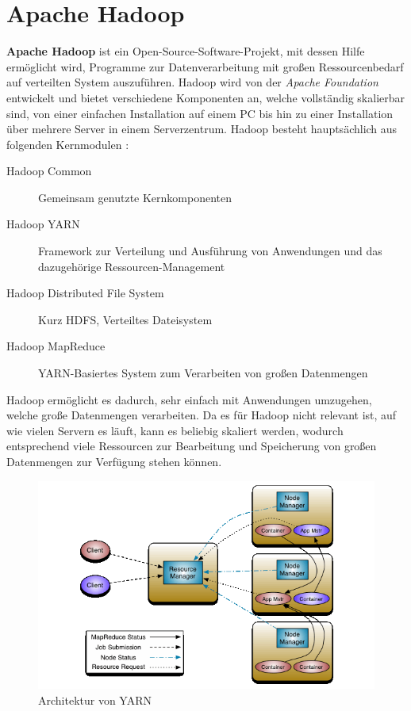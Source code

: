 \section{Apache Hadoop}\label{sec:hadoop}

\textbf{Apache Hadoop} ist ein Open-Source-Software-Projekt, mit dessen Hilfe ermöglicht wird, Programme zur Datenverarbeitung mit großen Ressourcenbedarf auf verteilten System auszuführen. Hadoop wird von der \emph{Apache Foundation} entwickelt und bietet verschiedene Komponenten an, welche vollständig skalierbar sind, von einer einfachen Installation auf einem PC bis hin zu einer Installation über mehrere Server in einem Serverzentrum. Hadoop besteht hauptsächlich aus folgenden Kernmodulen \cite{HadoopHomePage}:

\begin{description}
	\item[Hadoop Common] Gemeinsam genutzte Kernkomponenten
	\item[Hadoop YARN] Framework zur Verteilung und Ausführung von Anwendungen und das dazugehörige Ressourcen-Management
	\item[Hadoop Distributed File System] Kurz HDFS, Verteiltes Dateisystem
	\item[Hadoop MapReduce] YARN-Basiertes System zum Verarbeiten von großen Datenmengen
\end{description}

Hadoop ermöglicht es dadurch, sehr einfach mit Anwendungen umzugehen, welche große Datenmengen verarbeiten. Da es für Hadoop nicht relevant ist, auf wie vielen Servern es läuft, kann es beliebig skaliert werden, wodurch entsprechend viele Ressourcen zur Bearbeitung und Speicherung von großen Datenmengen zur Verfügung stehen können.

\begin{figure}
	\centering
	\includegraphics[width=\columnwidth]{./images/yarn_architecture.png}
	\caption[Architektur von YARN]{Architektur von YARN \cite{HadoopYarnArch271}}
	\label{fig:yarnarch}
\end{figure}

